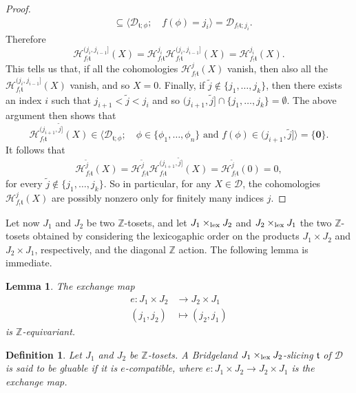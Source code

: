 \documentclass{article}
\newtheorem{lem}[thm]{Lemma}
\newtheorem{defn}[thm]{Definition}
\theoremstyle{definition}
\newcommand{\Z}{\mathbb{Z}}
\newcommand{\tee}{\mathfrak{t}}
\newcommand{\lex}{\times_{\textnormal{lex}}}
\begin{document}
\begin{proof}
\begin{align*}
&\subseteq \langle \mathscr{D}_{\tee;\phi};\quad  f(\phi)=j_{i}\rangle=\mathscr{D}_{f_!\tee;j_{i}}.
\end{align*}
Therefore
\[
\mathcal{H}^{(j_i,j_{i-1}]}_{f_!\tee}(X)=\mathcal{H}^{j_i}_{f_!\tee}\mathcal{H}^{(j_i,j_{i-1}]}_{f_!\tee}(X)=\mathcal{H}^{j_i}_{f_!\tee}(X).
\]
This tells us that, if all the cohomologies $\mathcal{H}^{j}_{f_!\tee}(X)$ vanish, then also all the $\mathcal{H}^{(j_i,j_{i-1}]}_{f_!\tee}(X)$ vanish, and so $X=0$. Finally, if $\tilde{j}\notin\{j_1,\dots,j_k\}$, then there exists an index $i$ such that $j_{i+1}<\tilde{j}<j_{i}$ and so $(j_{i+1},\tilde{j}]\cap \{j_1,\dots,j_k\}=\emptyset$. The above argument then shows that
\[
\mathcal{H}^{(j_{i+1},\tilde{j}]}_{f_!\tee}(X)\in\langle \mathscr{D}_{\tee;\phi};\quad \phi\in\{\phi_1,\dots,\phi_n\}\text{ and } f(\phi)\in(j_{i+1},\tilde{j}]\rangle=\{\mathbf{0}\}.
\]
It follows that 
\[
\mathcal{H}^{\tilde{j}}_{f_!\tee}(X)=\mathcal{H}^{\tilde{j}}_{f_!\tee}\mathcal{H}^{(j_{i+1},\tilde{j}]}_{f_!\tee}(X)=\mathcal{H}^{\tilde{j}}_{f_!\tee}(0)=0,
\]
for every $\tilde{j}\notin \{j_1,\dots,j_k\}$. So in particular, for any $X\in \mathscr{D}$, the cohomologies $\mathcal{H}^{j}_{f_!\tee}(X)$ are possibly nonzero only for finitely many indices $j$. 
\end{proof}


Let now $J_1$ and $J_2$ be two $\mathbb{Z}$-tosets, and let $J_1 \lex J_2$ and $J_2 \lex J_1$ the two $\Z$-tosets obtained by considering the lexicogaphic order on the products $J_1\times J_2$ and $J_2\times J_1$, respectively, and the diagonal $\Z$ action. The following lemma is immediate.
\begin{lem}
The exchange map
\begin{align*}
e\colon J_1\times J_2&\to J_2\times J_1\\
(j_1,j_2)&\mapsto (j_2,j_1)
\end{align*}
is $\Z$-equivariant.
\end{lem}

\begin{defn}\label{gluable}
Let $J_1$ and $J_2$ be $\Z$-tosets. A Bridgeland $J_1 \lex J_2$-slicing $\tee$ of $\mathscr{D}$ is said to be \emph{gluable} if it is $e$-compatible, where $e \colon J_1 \times J_2 \to J_2 \times J_1$ is the exchange map. 
\end{defn}
\end{document}
